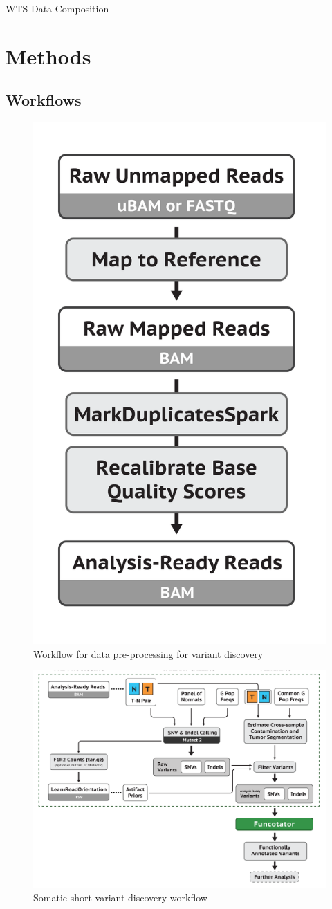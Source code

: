 \documentclass[11pt,a4paper,onecolumn,oneside]{report}
\begin{document}
            \begin{table}[p]
                \centering
                \label{tb:WTS-composition}
                \caption{WTS Data Composition}
                
            \end{table}
    \pagebreak

    \section{Methods}
        \subsection{Workflows}

            \begin{figure}[p]
                \centering
                \includegraphics[width=0.3 \linewidth]{figures/Workflow/mapping.png}
                \caption{Workflow for data pre-processing for variant discovery \protect\cite{gatk1, gatk2}}
                \label{fig:workflow-preprocessing}
            \end{figure}

            \begin{figure}[p]
                \centering
                \includegraphics[width=0.8 \linewidth]{figures/Workflow/somatic_short_variants.png}
                \caption{Somatic short variant discovery workflow \protect\cite{gatk1, gatk2}}
                \label{fig:workflow-somatic}
            \end{figure}
\end{document}
